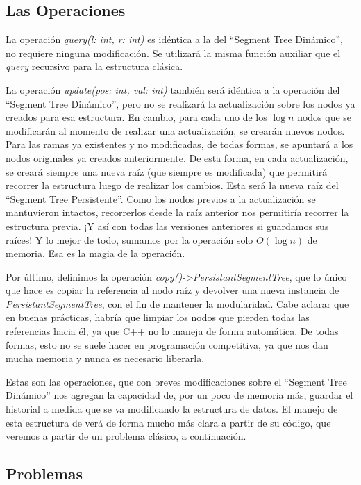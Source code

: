 \documentclass{article}
\begin{document}
\subsection{Las Operaciones}

La operación \textit{query(l: int, r: int)} es idéntica a la del ``Segment Tree Dinámico'', no requiere ninguna modificación. Se utilizará la misma función auxiliar que el \textit{query} recursivo para la estructura clásica. 

La operación \textit{update(pos: int, val: int)} también será idéntica a la operación del ``Segment Tree Dinámico'', pero no se realizará la actualización sobre los nodos ya creados para esa estructura. En cambio, para cada uno de los $\log n$ nodos que se modificarán al momento de realizar una actualización, se crearán nuevos nodos. Para las ramas ya existentes y no modificadas, de todas formas, se apuntará a los nodos originales ya creados anteriormente. De esta forma, en cada actualización, se creará siempre una nueva raíz (que siempre es modificada) que permitirá recorrer la estructura luego de realizar los cambios. Esta será la nueva raíz del ``Segment Tree Persistente''. Como los nodos previos a la actualización se mantuvieron intactos, recorrerlos desde la raíz anterior nos permitiría recorrer la estructura previa. ¡Y así con todas las versiones anteriores si guardamos sus raíces! Y lo mejor de todo, sumamos por la operación solo $O(\log n)$ de memoria. Esa es la magia de la operación.

Por último, definimos la operación \textit{copy()->PersistantSegmentTree}, que lo único que hace es copiar la referencia al nodo raíz y devolver una nueva instancia de \textit{PersistantSegmentTree}, con el fin de mantener la modularidad. Cabe aclarar que en buenas prácticas, habría que limpiar los nodos que pierden todas las referencias hacia él, ya que C++ no lo maneja de forma automática. De todas formas, esto no se suele hacer en programación competitiva, ya que nos dan mucha memoria y nunca es necesario liberarla.

Estas son las operaciones, que con breves modificaciones sobre el ``Segment Tree Dinámico'' nos agregan la capacidad de, por un poco de memoria más, guardar el historial a medida que se va modificando la estructura de datos. El manejo de esta estructura de verá de forma mucho más clara a partir de su código, que veremos a partir de un problema clásico, a continuación.

\subsection{Problemas}
\end{document}
